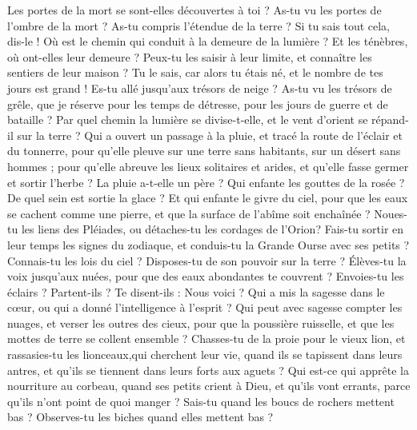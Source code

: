 \begin{multicols}{2}
Les portes de la mort se sont-elles découvertes à toi ? As-tu vu les portes de l'ombre de la mort ?
As-tu compris l'étendue de la terre ? Si tu sais tout cela, dis-le !
Où est le chemin qui conduit à la demeure de la lumière ? Et les ténèbres, où ont-elles leur demeure ?
Peux-tu les saisir à leur limite, et connaître les sentiers de leur maison ?
Tu le sais, car alors tu étais né, et le nombre de tes jours est grand !
Es-tu allé jusqu'aux trésors de neige ? As-tu vu les trésors de grêle,
que je réserve pour les temps de détresse, pour les jours de guerre et de bataille ?
Par quel chemin la lumière se divise-t-elle, et le vent d'orient se répand-il sur la terre ?
Qui a ouvert un passage à la pluie, et tracé la route de l'éclair et du tonnerre,
pour qu'elle pleuve sur une terre sans habitants, sur un désert sans hommes ;
pour qu'elle abreuve les lieux solitaires et arides, et qu'elle fasse germer et sortir l'herbe ?
La pluie a-t-elle un père ? Qui enfante les gouttes de la rosée ?
De quel sein est sortie la glace ? Et qui enfante le givre du ciel,
pour que les eaux se cachent comme une pierre, et que la surface de l'abîme soit enchaînée ?
Noues-tu les liens des Pléiades, ou détaches-tu les cordages de l'Orion?
Fais-tu sortir en leur temps les signes du zodiaque, et conduis-tu la Grande Ourse avec ses petits ?
Connais-tu les lois du ciel ? Disposes-tu de son pouvoir sur la terre ?
Élèves-tu la voix jusqu'aux nuées, pour que des eaux abondantes te couvrent ?
Envoies-tu les éclairs ? Partent-ils ? Te disent-ils : Nous voici ?
Qui a mis la sagesse dans le cœur, ou qui a donné l'intelligence à l'esprit ?
Qui peut avec sagesse compter les nuages, et verser les outres des cieux,
pour que la poussière ruisselle, et que les mottes de terre se collent ensemble ?
\VerseOne{}Chasses-tu de la proie pour le vieux lion, et rassasies-tu les lionceaux,qui cherchent leur vie,
quand ils se tapissent dans leurs antres, et qu'ils se tiennent dans leurs forts aux aguets ? 
Qui est-ce qui apprête la nourriture au corbeau, quand ses petits crient à Dieu, et qu'ils vont errants, parce qu'ils n'ont point de quoi manger ?
Sais-tu quand les boucs de rochers mettent bas ? Observes-tu les biches quand elles mettent bas ?

\end{multicols}
